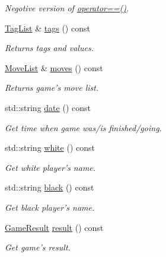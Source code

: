 \begin{DoxyCompactItemize}
\begin{DoxyCompactList}\small\item\em Negotive version of \hyperlink{classpgn_1_1Game_a77fc6ee1f9df2cfe681cd3f5349ea406}{operator==()}. \item\end{DoxyCompactList}\item 
\hyperlink{classpgn_1_1TagList}{TagList} \& \hyperlink{classpgn_1_1Game_a2f6db558f0ad800a8550dc140d9b593b}{tags} () const 
\begin{DoxyCompactList}\small\item\em Returns tags and values. \item\end{DoxyCompactList}\item 
\hyperlink{classpgn_1_1MoveList}{MoveList} \& \hyperlink{classpgn_1_1Game_a0a5ba73b2f7a9b02fbc43369942ea26f}{moves} () const 
\begin{DoxyCompactList}\small\item\em Returns game's move list. \item\end{DoxyCompactList}\item 
std::string \hyperlink{classpgn_1_1Game_ad1da6be6fcaa426c8e2232680b4c0a97}{date} () const 
\begin{DoxyCompactList}\small\item\em Get time when game was/is finished/going. \item\end{DoxyCompactList}\item 
std::string \hyperlink{classpgn_1_1Game_a20dd691b942f9d6869c7d538936475e2}{white} () const 
\begin{DoxyCompactList}\small\item\em Get white player's name. \item\end{DoxyCompactList}\item 
std::string \hyperlink{classpgn_1_1Game_a06e6c7feadcac154ee59bcde7deb01f8}{black} () const 
\begin{DoxyCompactList}\small\item\em Get black player's name. \item\end{DoxyCompactList}\item 
\hyperlink{classpgn_1_1GameResult}{GameResult} \hyperlink{classpgn_1_1Game_ad46a700f9803ed86e10f29d5e910301d}{result} () const 
\begin{DoxyCompactList}\small\item\em Get game's result. \item\end{DoxyCompactList}\item 

\end{DoxyCompactItemize}
